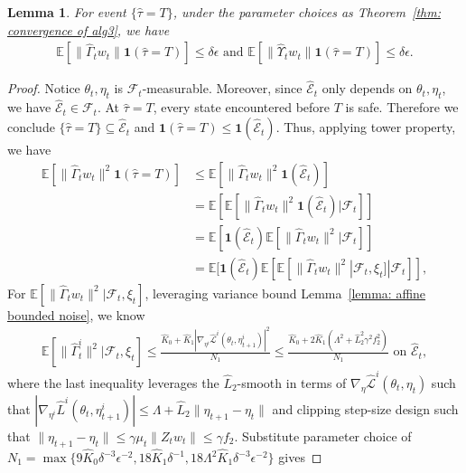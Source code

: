 \documentclass[twoside]{article} %
\theoremstyle{plain}
\newtheorem{lemma}[theorem]{Lemma}
\theoremstyle{definition}
\theoremstyle{remark}
\newcommand{\HGamma}{\hat{\Gamma}}
\newcommand{\HUpsilon}{\hat{\Upsilon}}
\newcommand{\hL}{\hat{L}}
\newcommand{\htau}{\hat{\tau}}
\newcommand{\fhL}{\hat{\mathcal{L}}}
\newcommand{\calhatE}{\mathcal{\hat{E}}}
\begin{document}
\begin{lemma}\label{lemma: conditioned GammaXi}
   For event $\{\htau = T \}$, under the parameter choices as Theorem~\ref{thm: convergence of alg3}, we have
   \begin{align}
        \mathbb{E}[\|\HGamma_tw_t\|\mathbf{1}(\htau = T)]\leq \delta\epsilon \text{ and }\mathbb{E}[\|\HUpsilon_tw_t\|\mathbf{1}(\htau = T)]\leq \delta\epsilon.
   \end{align}
\end{lemma}
\begin{proof}
    Notice $\theta_t, \eta_t$ is $\mathcal{F}_t$-measurable. Moreover, since $\calhatE_t$ only depends on $\theta_t,\eta_t$, we have $\calhatE_t \in \mathcal{F}_t$.
    At $\htau = T$, every state encountered before $T$ is safe. Therefore we conclude $\{\htau = T \}\subseteq \calhatE_t$ and $\mathbf{1}(\htau = T)\leq \mathbf{1}(\calhatE_t)$. Thus, applying tower property, we have
    \begin{align}
        \mathbb{E}[\|\HGamma_tw_t\|^2\mathbf{1}(\htau = T)] &\leq \mathbb{E}[\|\HGamma_tw_t\|^2\mathbf{1}(\calhatE_t)]\nonumber\\
        &= \mathbb{E}[\mathbb{E}[\|\HGamma_tw_t\|^2\mathbf{1}(\calhatE_t)|\mathcal{F}_t]]\nonumber\\
        & = \mathbb{E}[\mathbf{1}(\calhatE_t)\mathbb{E}[\|\HGamma_tw_t\|^2|\mathcal{F}_t]]\nonumber\\
        & =  \mathbb{E}[\mathbf{1}(\calhatE_t)\mathbb{E}[\mathbb{E}[\|\HGamma_tw_t\|^2|\mathcal{F}_t,\xi_t]|\mathcal{F}_t]],
    \end{align}
    For $\mathbb{E}[\|\HGamma_tw_t\|^2|\mathcal{F}_t,\xi_t]$, leveraging variance bound Lemma~\ref{lemma: affine bounded noise}, we know
    \begin{align}
        \mathbb{E}[\|\HGamma_t^i\|^2 |\mathcal{F}_t, \xi_t] \leq \frac{\hat{K}_0+\hat{K}_1|\nabla_{\eta^i} \fhL^i(\theta_t, \eta_{t+1}^i)|^2}{N_1}\leq \frac{\hat{K}_0+2\hat{K}_1( \Lambda^2+{\hL}_2^2 \gamma^2 f_2^2) }{N_1} \text{ on } \calhatE_t,
    \end{align}
    where the last inequality leverages the $\hL_2$-smooth in terms of $\nabla_{\eta}\fhL^i(\theta_t, \eta_{t})$ such that $|\nabla_{\eta^i} \widehat{L}^i\left(\theta_t, \eta_{t+1}^i\right)| \leq \Lambda+\hL_2 \|\eta_{t+1}-\eta_t\|$ and clipping step-size design such that $\|\eta_{t+1}-\eta_t\|\leq \gamma \mu_t \|Z_tw_t\|\leq \gamma f_2$.
    Substitute parameter choice of $N_1 = \max\big\{9\hat{K}_0\delta^{-3}\epsilon^{-2}, 18\hat{K}_1\delta^{-1}, 18\Lambda^2\hat{K}_1\delta^{-3}\epsilon^{-2}\}$ gives 

\end{proof}
\end{document}
